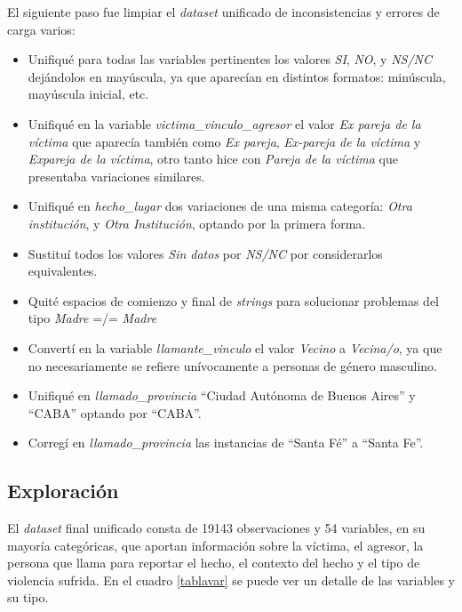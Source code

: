 \documentclass[10 pt]{article}
\begin{document}
El siguiente paso fue limpiar el \textit{dataset} unificado de inconsistencias y errores de carga varios: 
\begin{itemize}
    \item Unifiqué para todas las variables pertinentes los valores \textit{SI}, \textit{NO}, y \textit{NS/NC} dejándolos en mayúscula, ya que aparecían en distintos formatos: minúscula, mayúscula inicial, etc.
    \item Unifiqué en la variable \textit{victima\_vinculo\_agresor} el valor \textit{Ex pareja de la víctima} que aparecía también como \textit{Ex pareja}, \textit{Ex-pareja de la víctima} y \textit{Expareja de la víctima}, otro tanto hice con \textit{Pareja de la víctima} que presentaba variaciones similares.
    \item Unifiqué en \textit{hecho\_lugar} dos variaciones de una misma categoría: \textit{Otra institución}, y \textit{Otra Institución}, optando por la primera forma.
    \item Sustituí todos los valores \textit{Sin datos} por \textit{NS/NC} por considerarlos equivalentes.
    \item Quité espacios de comienzo y final de \textit{strings} para solucionar problemas del tipo \textit{Madre} =/= \textit{  Madre} 
    \item Convertí en la variable \textit{llamante\_vinculo} el valor \textit{Vecino} a \textit{Vecina/o}, ya que  no necesariamente se refiere unívocamente a personas de género masculino.
    \item Unifiqué en \textit{llamado\_provincia} “Ciudad Autónoma de Buenos Aires” y “CABA” optando por “CABA”. 
    \item Corregí en \textit{llamado\_provincia }las instancias de “Santa Fé” a “Santa Fe”.

\end{itemize}

\subsection{Exploración}\label{exploración}

El \textit{dataset} final unificado consta de 19143 observaciones y 54 variables, en su mayoría categóricas, que aportan información sobre la víctima, el agresor, la persona que llama para reportar el hecho, el contexto del hecho y el tipo de violencia sufrida. En el cuadro \ref{tablavar} se puede ver un detalle de las variables y su tipo.
\end{document}
